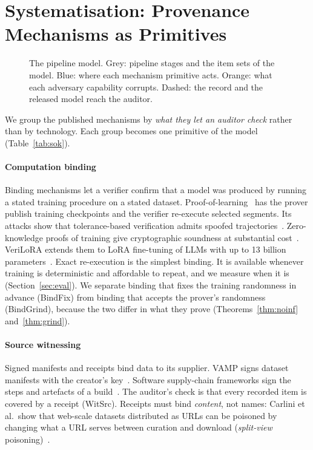 \section{Systematisation: Provenance Mechanisms as Primitives}\label{sec:sok}

\begin{figure}[t]
\centering
\resizebox{\columnwidth}{!}{}
\caption{The pipeline model. Grey: pipeline stages and the item sets of the model. Blue: where each mechanism primitive acts. Orange: what each adversary capability corrupts. Dashed: the record and the released model reach the auditor.}
\label{fig:pipeline}
\end{figure}

We group the published mechanisms by \emph{what they let an auditor check} rather than by
technology. Each group becomes one primitive of the model (Table~\ref{tab:sok}).

\paragraph{Computation binding}
Binding mechanisms let a verifier confirm that a model was produced by running a stated
training procedure on a stated dataset. Proof-of-learning~\cite{jia2021pol} has the prover
publish training checkpoints and the verifier re-execute selected segments. Its attacks
show that tolerance-based verification admits spoofed trajectories~\cite{fang2023pol}.
Zero-knowledge proofs of training give cryptographic soundness at substantial
cost~\cite{abbaszadeh2024zkpot,tan2025zkpot}. VeriLoRA extends them to LoRA fine-tuning of
LLMs with up to 13 billion parameters~\cite{liao2026verilora}. Exact re-execution is the
simplest binding. It is available whenever training is deterministic and affordable to
repeat, and we measure when it is (Section~\ref{sec:eval}). We separate binding that fixes
the training randomness in advance (\textsf{BindFix}) from binding that accepts the
prover's randomness (\textsf{BindGrind}), because the two differ in what they prove
(Theorems~\ref{thm:noinf} and~\ref{thm:grind}).

\paragraph{Source witnessing}
Signed manifests and receipts bind data to its supplier. VAMP signs dataset manifests with
the creator's key~\cite{stokes2021prevent}. Software supply-chain frameworks sign the steps
and artefacts of a build~\cite{torresarias2019intoto,newman2022sigstore}. The auditor's
check is that every recorded item is covered by a receipt (\textsf{WitSrc}). Receipts must
bind \emph{content}, not names: Carlini et al.\ show that web-scale datasets distributed
as URLs can be poisoned by changing what a URL serves between curation and
download (\emph{split-view} poisoning)~\cite{carlini2024poisoning}.

